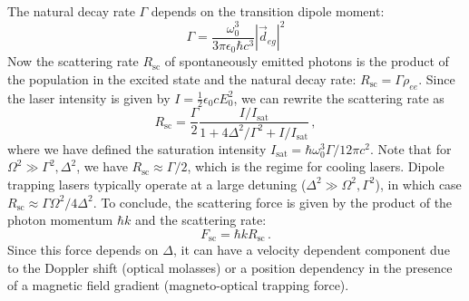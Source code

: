 \documentclass[../Thesis-IJspeert.tex]{subfiles}
\begin{document}
The natural decay rate $\Gamma$ depends on the transition dipole moment:
\begin{equation}
\Gamma=\frac{\omega_0^3}{3\pi\epsilon_0\hbar c^3}|\vec{d}_{eg}|^2
\end{equation}
Now the scattering rate $R_\text{sc}$ of spontaneously emitted photons is the product of the population in the excited state and the natural decay rate: $R_\text{sc}=\Gamma \rho_{ee}$. Since the laser intensity is given by $I=\frac{1}{2}\epsilon_0 c E_0^2$, we can rewrite the scattering rate as
\begin{equation}
\label{scatter}
R_\text{sc}=\frac{\Gamma}{2}\frac{I/I_\text{sat}}{1+4\Delta^2/\Gamma^2+I/I_\text{sat}}\,,
\end{equation}
where we have defined the saturation intensity $I_\text{sat}=\hbar \omega_0^3\Gamma/12\pi c^2$. Note that for $\Omega^2\gg\Gamma^2,\Delta^2$, we have $R_\text{sc}\approx\Gamma/2$, which is the regime for cooling lasers. Dipole trapping lasers typically operate at a large detuning ($\Delta^2\gg\Omega^2,\Gamma^2$), in which case $R_\text{sc}\approx\Gamma\Omega^2/4\Delta^2$. To conclude, the scattering force is given by the product of the photon momentum $\hbar k$ and the scattering rate:
\begin{equation}
F_\text{sc}=\hbar kR_\text{sc}\,.
\end{equation}
Since this force depends on $\Delta$, it can have a velocity dependent component due to the Doppler shift (optical molasses) or a position dependency in the presence of a magnetic field gradient (magneto-optical trapping force).
\end{document}
